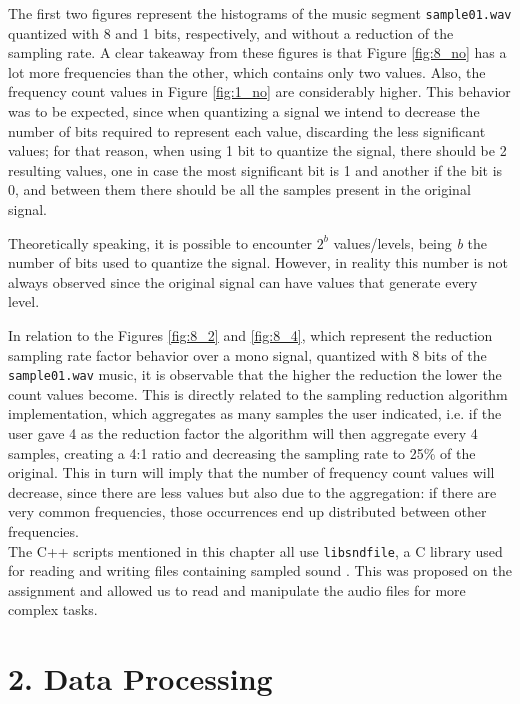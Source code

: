 \documentclass[12pt]{article}
\begin{document}
The first two figures represent the histograms of the music segment 
\texttt{sample01.wav} quantized with 8 and 1 bits, respectively, and without a 
reduction of the sampling rate. 
A clear takeaway from these figures is that Figure \ref{fig:8_no} has a lot 
more frequencies than the other, which contains only two values.
Also, the frequency count values in Figure \ref{fig:1_no} are considerably higher. 
This behavior was to be expected, since when quantizing a signal we intend to 
decrease the number of bits required to represent each value, discarding the less 
significant values; for that reason, when using 1 bit to quantize the signal, 
there should be 2 resulting values, one in case the most significant bit is 1 and 
another if the bit is 0, and between them there should be all the samples 
present in the original signal. 

Theoretically speaking, it is possible to encounter $2^{b}$ values/levels, being 
{\it b\/} the number of bits used to quantize the signal.
However, in reality this number is not always observed since the original signal 
can have values that generate every level. 

In relation to the Figures \ref{fig:8_2} and \ref{fig:8_4}, which represent the 
reduction sampling rate factor behavior over a mono signal, quantized with 8 bits 
of the \texttt{sample01.wav} music, it is observable that the higher the reduction
the lower the count values become. 
This is directly related to the sampling reduction algorithm implementation, 
which aggregates as many samples the user indicated, i.e. if the user gave 4 as 
the reduction factor the algorithm will then aggregate every 4 samples, creating 
a 4:1 ratio and decreasing the sampling rate to 25\% of the original. 
This in turn will imply that the number of frequency count values will decrease,
since there are less values but also due to the aggregation: if there are very 
common frequencies, those occurrences end up distributed between other frequencies. \\

The C++ scripts mentioned in this chapter all use \texttt{libsndfile}, a C 
library used for reading and writing files containing sampled sound \cite{libsndfile}.
This was proposed on the assignment and allowed us to read and manipulate the 
audio files for more complex tasks.

\newpage
\section*{2. Data Processing}
\end{document}
